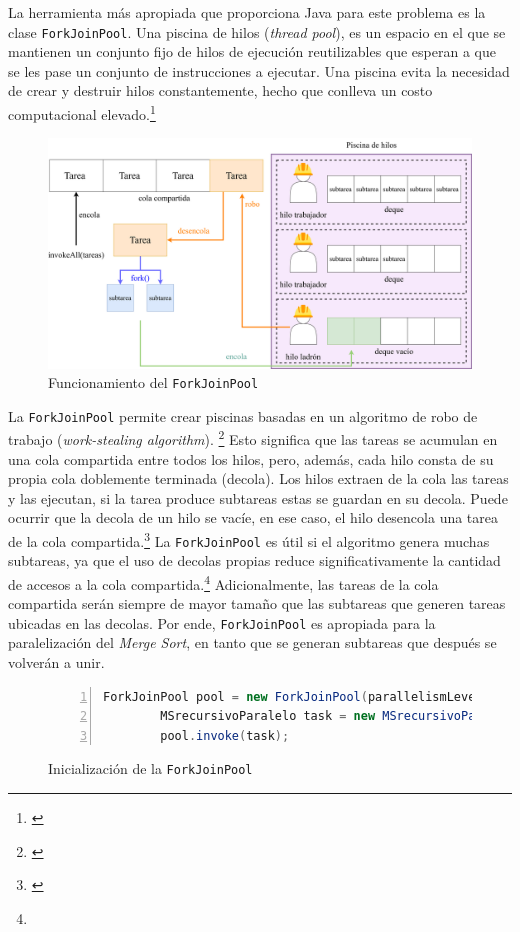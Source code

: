 \documentclass[titlepage]{article}
\begin{document}
La herramienta más apropiada que proporciona Java para este problema es la clase \lstinline{ForkJoinPool}.\footnotemark {} Una piscina de hilos (\textit{thread pool}), es un espacio en el que se mantienen un conjunto fijo de hilos de ejecución reutilizables que esperan a que se les pase un conjunto de instrucciones a ejecutar. Una piscina evita la necesidad de crear y destruir hilos constantemente, hecho que conlleva un costo computacional elevado.\footnote{\cite{engle_2022}}

\begin{figure}[h]
	\centering
	\includegraphics[width=0.75\linewidth]{Diagrames/forkJoinPool.png}
	\caption{Funcionamiento del \lstinline{ForkJoinPool}}
	\label{fig:forkJoinPool}
\end{figure}

La \lstinline{ForkJoinPool} permite crear piscinas basadas en un algoritmo de robo de trabajo (\textit{work-stealing algorithm}). \footnote{\cite{Ramgir2017-mv}} Esto significa que las tareas se acumulan en una cola compartida entre todos los hilos, pero, además, cada hilo consta de su propia cola doblemente terminada (decola). Los hilos extraen de la cola las tareas y las ejecutan, si la tarea produce subtareas estas se guardan en su decola. Puede ocurrir que la decola de un hilo se vacíe, en ese caso, el hilo desencola una tarea de la cola compartida.\footnote{\cite{kumar_2024}} La \lstinline{ForkJoinPool} es útil si el algoritmo genera muchas subtareas, ya que el uso de decolas propias reduce significativamente la cantidad de accesos a la cola compartida.\footnote[17]{} Adicionalmente, las tareas de la cola compartida serán siempre de mayor tamaño que las subtareas que generen tareas ubicadas en las decolas. Por ende, \lstinline{ForkJoinPool} es apropiada para la paralelización del \textit{Merge Sort}, en tanto que se generan subtareas que después se volverán a unir.

\begin{figure}[h]
	\begin{lstlisting}[language=java, frame=single, numbers=left]
		ForkJoinPool pool = new ForkJoinPool(parallelismLevel);
		MSrecursivoParalelo task = new MSrecursivoParalelo(arr, aux, left, right);
		pool.invoke(task);
	\end{lstlisting}
	\caption{Inicialización de la \lstinline{ForkJoinPool}}
	\label{fig:creacionForkJoinPool}
\end{figure}
\end{document}
